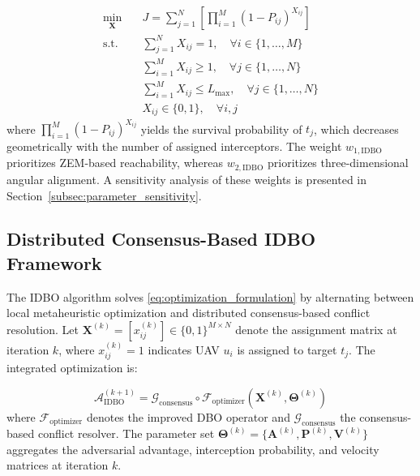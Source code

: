 \documentclass[lettersize,journal]{IEEEtran}
\newcommand{\hladd}[1]{{\color{blue}#1}}
\begin{document}
\begin{equation}
\label{eq:optimization_formulation}
\begin{aligned}
\min_{\mathbf{X}} \quad & J = \sum_{j=1}^{N} \left[ \prod_{i=1}^{M} \left(1 - P_{ij}\right)^{X_{ij}} \right] \\
\text{s.t.} \quad & \sum_{j=1}^{N} X_{ij} = 1, \quad \forall i \in \{1,\dots,M\} \\
& \sum_{i=1}^{M} X_{ij} \geq 1, \quad \forall j \in \{1,\dots,N\} \\
& \sum_{i=1}^{M} X_{ij} \leq L_{\max}, \quad \forall j \in \{1,\dots,N\} \\
& X_{ij} \in \{0,1\}, \quad \forall i,j
\end{aligned}
\end{equation}
where $\prod_{i=1}^{M} (1 - P_{ij})^{X_{ij}}$ yields the survival probability of $t_j$, which decreases geometrically with the number of assigned interceptors.
\hladd{The weight $w_{1,\mathrm{IDBO}}$ prioritizes ZEM-based reachability, whereas $w_{2,\mathrm{IDBO}}$ prioritizes three-dimensional angular alignment. A sensitivity analysis of these weights is presented in Section~\ref{subsec:parameter_sensitivity}.}



\subsection{Distributed Consensus-Based IDBO Framework}
\label{subsec:idbo_algorithm}

The IDBO algorithm solves \eqref{eq:optimization_formulation} by alternating between local metaheuristic optimization and distributed consensus-based conflict resolution. Let $\mathbf{X}^{(k)} = [x_{ij}^{(k)}] \in \{0,1\}^{M \times N}$ denote the assignment matrix at iteration $k$, where $x_{ij}^{(k)}=1$ indicates UAV $u_i$ is assigned to target $t_j$. The integrated optimization is:

\begin{equation}
\label{eq:hierarchical}
\mathcal{A}_{\text{IDBO}}^{(k+1)} = \mathcal{G}_{\text{consensus}} \circ \mathcal{F}_{\text{optimizer}} \left( \mathbf{X}^{(k)}, \boldsymbol{\Theta}^{(k)} \right)
\end{equation}
where $\mathcal{F}_{\text{optimizer}}$ denotes the improved DBO operator and $\mathcal{G}_{\text{consensus}}$ the consensus-based conflict resolver. The parameter set $\boldsymbol{\Theta}^{(k)} = \{\mathbf{A}^{(k)}, \mathbf{P}^{(k)}, \mathbf{V}^{(k)}\}$ aggregates the adversarial advantage, interception probability, and velocity matrices at iteration $k$.
\end{document}
